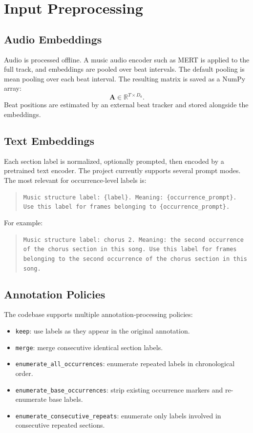 \documentclass[11pt,a4paper]{article}
\newcommand{\audioseq}{\mathbf{A}}
\begin{document}
\section{Input Preprocessing}

\subsection{Audio Embeddings}

Audio is processed offline. A music audio encoder such as MERT is applied to the full
track, and embeddings are pooled over beat intervals. The default pooling is mean
pooling over each beat interval. The resulting matrix is saved as a NumPy array:
\begin{equation}
  \audioseq \in \mathbb{R}^{T \times D_a}.
\end{equation}
Beat positions are estimated by an external beat tracker and stored alongside the
embeddings.

\subsection{Text Embeddings}

Each section label is normalized, optionally prompted, then encoded by a pretrained
text encoder. The project currently supports several prompt modes. The most relevant
for occurrence-level labels is:
\begin{quote}
\texttt{Music structure label: \{label\}. Meaning: \{occurrence\_prompt\}. Use this label for frames belonging to \{occurrence\_prompt\}.}
\end{quote}
For example:
\begin{quote}
\texttt{Music structure label: chorus 2. Meaning: the second occurrence of the chorus section in this song. Use this label for frames belonging to the second occurrence of the chorus section in this song.}
\end{quote}

\subsection{Annotation Policies}

The codebase supports multiple annotation-processing policies:
\begin{itemize}[leftmargin=*]
  \item \texttt{keep}: use labels as they appear in the original annotation.
  \item \texttt{merge}: merge consecutive identical section labels.
  \item \texttt{enumerate\_all\_occurrences}: enumerate repeated labels in chronological order.
  \item \texttt{enumerate\_base\_occurrences}: strip existing occurrence markers and re-enumerate base labels.
  \item \texttt{enumerate\_consecutive\_repeats}: enumerate only labels involved in consecutive repeated sections.
\end{itemize}
\end{document}
